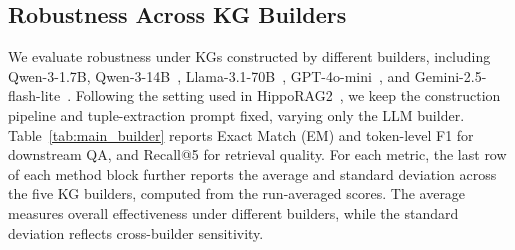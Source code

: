 \documentclass{article}
\theoremstyle{plain}
\theoremstyle{definition}
\theoremstyle{remark}
\begin{document}


\subsection{Robustness Across KG Builders}
\label{sec:main_builder}

We evaluate robustness under KGs constructed by different builders, including Qwen-3-1.7B, Qwen-3-14B~\cite{qwen3_technical_report_2025}, Llama-3.1-70B~\cite{llama3.1}, GPT-4o-mini~\cite{gpt-4o}, and Gemini-2.5-flash-lite~\cite{gemini2.5}. Following the setting used in HippoRAG2~\cite{hipporag2}, we keep the construction pipeline and tuple-extraction prompt fixed, varying only the LLM builder. Table~\ref{tab:main_builder} reports Exact Match (EM) and token-level F1 for downstream QA, and Recall@5 for retrieval quality. For each metric, the last row of each method block further reports the average and standard deviation across the five KG builders, computed from the run-averaged scores. The average measures overall effectiveness under different builders, while the standard deviation reflects cross-builder sensitivity.
\end{document}
